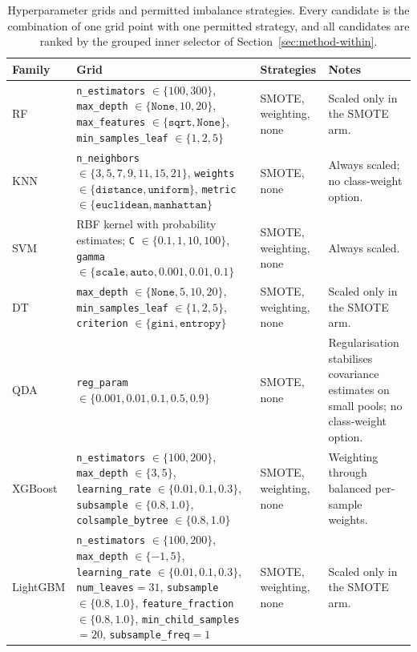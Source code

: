 \documentclass[conference]{IEEEtran}
\begin{document}
\begin{table}[t]
\caption{Hyperparameter grids and permitted imbalance strategies. Every candidate is the combination of one grid point with one permitted strategy, and all candidates are ranked by the grouped inner selector of Section~\ref{sec:method-within}.}
\label{tab:classifier-policy}
\centering
\begingroup
\scriptsize
\setlength{\tabcolsep}{4pt}
\renewcommand{\arraystretch}{1.12}
\begin{tabular}{>{\raggedright\arraybackslash}p{1.3cm}>{\raggedright\arraybackslash}p{8.4cm}>{\raggedright\arraybackslash}p{2.3cm}>{\raggedright\arraybackslash}p{3.6cm}}
\toprule
Family & Grid & Strategies & Notes \\
\midrule
RF &
\texttt{n\_estimators} $\in \{100,300\}$, \texttt{max\_depth} $\in \{\texttt{None},10,20\}$, \texttt{max\_features} $\in \{\texttt{sqrt},\texttt{None}\}$, \texttt{min\_samples\_leaf} $\in \{1,2,5\}$ &
SMOTE, weighting, none &
Scaled only in the SMOTE arm. \\
KNN &
\texttt{n\_neighbors} $\in \{3,5,7,9,11,15,21\}$, \texttt{weights} $\in \{\texttt{distance},\texttt{uniform}\}$, \texttt{metric} $\in \{\texttt{euclidean},\texttt{manhattan}\}$ &
SMOTE, none &
Always scaled; no class-weight option. \\
SVM &
RBF kernel with probability estimates; \texttt{C} $\in \{0.1,1,10,100\}$, \texttt{gamma} $\in \{\texttt{scale},\texttt{auto},0.001,0.01,0.1\}$ &
SMOTE, weighting, none &
Always scaled. \\
DT &
\texttt{max\_depth} $\in \{\texttt{None},5,10,20\}$, \texttt{min\_samples\_leaf} $\in \{1,2,5\}$, \texttt{criterion} $\in \{\texttt{gini},\texttt{entropy}\}$ &
SMOTE, weighting, none &
Scaled only in the SMOTE arm. \\
QDA &
\texttt{reg\_param} $\in \{0.001,0.01,0.1,0.5,0.9\}$ &
SMOTE, none &
Regularisation stabilises covariance estimates on small pools; no class-weight option. \\
XGBoost &
\texttt{n\_estimators} $\in \{100,200\}$, \texttt{max\_depth} $\in \{3,5\}$, \texttt{learning\_rate} $\in \{0.01,0.1,0.3\}$, \texttt{subsample} $\in \{0.8,1.0\}$, \texttt{colsample\_bytree} $\in \{0.8,1.0\}$ &
SMOTE, weighting, none &
Weighting through balanced per-sample weights. \\
LightGBM &
\texttt{n\_estimators} $\in \{100,200\}$, \texttt{max\_depth} $\in \{-1,5\}$, \texttt{learning\_rate} $\in \{0.01,0.1,0.3\}$, \texttt{num\_leaves}$=31$, \texttt{subsample} $\in \{0.8,1.0\}$, \texttt{feature\_fraction} $\in \{0.8,1.0\}$, \texttt{min\_child\_samples}$=20$, \texttt{subsample\_freq}$=1$ &
SMOTE, weighting, none &
Scaled only in the SMOTE arm. \\
\bottomrule
\end{tabular}
\endgroup
\end{table}
\end{document}
